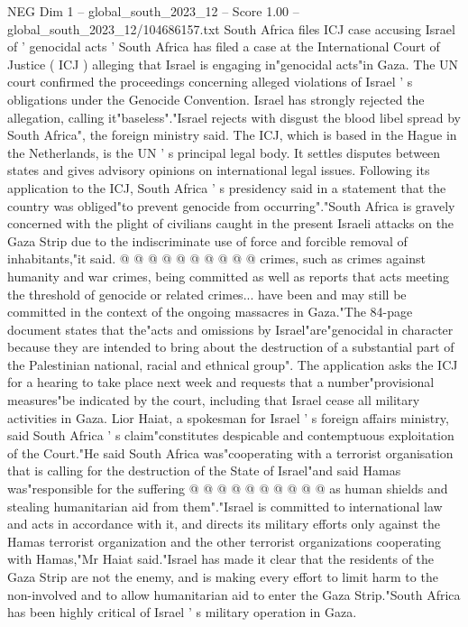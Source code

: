 \begin{textsample}{NEG Dim 1 – global\_south\_2023\_12 – Score 1.00 – global\_south\_2023\_12/104686157.txt}  \label{ex:f1_neg_287}
South Africa files ICJ case accusing Israel of ' genocidal acts ' South Africa has filed a case at the International Court of Justice ( ICJ ) alleging that Israel is engaging in"genocidal acts"in Gaza.
The UN court confirmed the proceedings concerning alleged violations of Israel ' s obligations under the Genocide Convention.
Israel has strongly rejected the allegation, calling it"baseless"."Israel rejects with disgust the blood libel spread by South Africa", the foreign ministry said.
The ICJ, which is based in the Hague in the Netherlands, is the UN ' s principal legal body.
It settles disputes between states and gives advisory opinions on international legal issues.
Following its application to the ICJ, South Africa ' s presidency said in a statement that the country was obliged"to prevent genocide from occurring"."South Africa is gravely concerned with the plight of civilians caught in the present Israeli attacks on the Gaza Strip due to the indiscriminate use of force and forcible removal of inhabitants,"it said. @ @ @ @ @ @ @ @ @ @ crimes, such as crimes against humanity and war crimes, being committed as well as reports that acts meeting the threshold of genocide or related crimes... have been and may still be committed in the context of the ongoing massacres in Gaza."The 84-page document states that the"acts and omissions by Israel"are"genocidal in character because they are intended to bring about the destruction of a substantial part of the Palestinian national, racial and ethnical group".
The application asks the ICJ for a hearing to take place next week and requests that a number"provisional measures"be indicated by the court, including that Israel cease all military activities in Gaza.
Lior Haiat, a spokesman for Israel ' s foreign affairs ministry, said South Africa ' s claim"constitutes despicable and contemptuous exploitation of the Court."He said South Africa was"cooperating with a terrorist organisation that is calling for the destruction of the State of Israel"and said Hamas was"responsible for the suffering @ @ @ @ @ @ @ @ @ @ as human shields and stealing humanitarian aid from them"."Israel is committed to international law and acts in accordance with it, and directs its military efforts only against the Hamas terrorist organization and the other terrorist organizations cooperating with Hamas,"Mr Haiat said."Israel has made it clear that the residents of the Gaza Strip are not the enemy, and is making every effort to limit harm to the non-involved and to allow humanitarian aid to enter the Gaza Strip."South Africa has been highly critical of Israel ' s military operation in Gaza.

\end{textsample}
